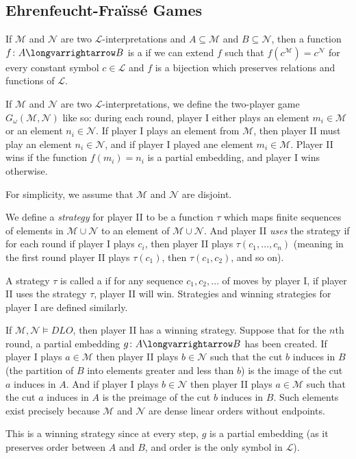 \documentclass[10pt]{article}
\let\longto=\longvarrightarrow
\def\mL{\mathcal{L}}
\def\mM{\mathcal{M}}
\def\mN{\mathcal{N}}
\begin{document}
\newpage
\subsection{Ehrenfeucht-Fra\"iss\'e Games}

\begin{defn*}

    If $\mM$ and $\mN$ are two $\mL$-interpretations and $A\subseteq\mM$ and $B\subseteq\mN$, then a function $f\colon A\longto B$ is a  if we can extend $f$ such that
    $f(c^\mM)=c^\mN$ for every constant symbol $c\in\mL$ and $f$ is a bijection which preserves relations and functions of $\mL$.

\end{defn*}

If $\mM$ and $\mN$ are two $\mL$-interpretations, we define the two-player game $G_\omega(\mM,\mN)$ like so: during each round, player I either plays an element $m_i\in\mM$ or an element $n_i\in\mN$.
If player I plays an element from $\mM$, then player II must play an element $n_i\in\mN$, and if player I played ane element $m_i\in\mM$.
Player II wins if the function $f(m_i)=n_i$ is a partial embedding, and player I wins otherwise.

For simplicity, we assume that $\mM$ and $\mN$ are disjoint.

We define a \emph{strategy} for player II to be a function $\tau$ which maps finite sequences of elements in $\mM\cup\mN$ to an element of $\mM\cup\mN$.
And player II \emph{uses} the strategy if for each round if player I plays $c_i$, then player II plays $\tau(c_1,\dots,c_n)$ (meaning in the first round player II plays $\tau(c_1)$, then $\tau(c_1,c_2)$,
and so on).

A strategy $\tau$ is called a  if for any sequence $c_1,c_2,\dots$ of moves by player I, if player II uses the strategy $\tau$, player II will win.
Strategies and winning strategies for player I are defined similarly.

\begin{exam*}

    If $\mM,\mN\vDash\mathit{DLO}$, then player II has a winning strategy.
    Suppose that for the $n$th round, a partial embedding $g\colon A\longto B$ has been created.
    If player I plays $a\in\mM$ then player II plays $b\in\mN$ such that the cut $b$ induces in $B$ (the partition of $B$ into elements greater and less than $b$) is the image of the cut $a$ induces in $A$.
    And if player I plays $b\in\mN$ then player II plays $a\in\mM$ such that the cut $a$ induces in $A$ is the preimage of the cut $b$ induces in $B$.
    Such elements exist precisely because $\mM$ and $\mN$ are dense linear orders without endpoints.

    This is a winning strategy since at every step, $g$ is a partial embedding (as it preserves order between $A$ and $B$, and order is the only symbol in $\mL$).

\end{exam*}
\end{document}

